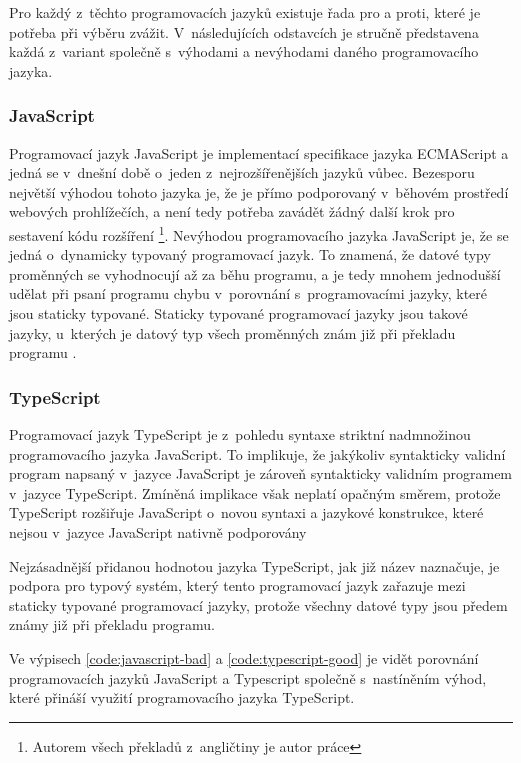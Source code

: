 Pro každý z~těchto programovacích jazyků existuje řada pro a proti, které je potřeba při výběru zvážit. V~následujících odstavcích je stručně představena každá z~variant společně s~výhodami a nevýhodami daného programovacího jazyka.

\subsubsection{JavaScript}

 Programovací jazyk JavaScript je implementací specifikace jazyka ECMAScript a jedná se v~dnešní době o~jeden z~nejrozšířenějších jazyků vůbec. Bezesporu největší výhodou tohoto jazyka je, že je přímo podporovaný v~běhovém prostředí webových prohlížečích, a není tedy potřeba zavádět žádný další krok pro sestavení kódu rozšíření \cite[kap. 1]{flanagan_javascript_2020}\footnote{Autorem všech překladů z~angličtiny je autor práce}. 
 Nevýhodou programovacího jazyka JavaScript je, že se jedná o~dynamicky typovaný programovací jazyk. To znamená, že datové typy proměnných se vyhodnocují až za běhu programu, a je tedy mnohem jednodušší udělat při psaní programu chybu v~porovnání s~programovacími jazyky, které jsou staticky typované. Staticky typované programovací jazyky jsou takové jazyky, u~kterých je datový typ všech proměnných znám již při překladu programu \cite[kap. 3.1]{flanagan_javascript_2020}.

\subsubsection{TypeScript}

Programovací jazyk TypeScript je z~pohledu syntaxe striktní nadmnožinou programovacího jazyka JavaScript. 
To implikuje, že jakýkoliv syntakticky validní program napsaný v~jazyce JavaScript je zároveň syntakticky validním programem v~jazyce TypeScript. Zmíněná implikace však neplatí opačným směrem, protože TypeScript rozšiřuje JavaScript o~novou syntaxi a jazykové konstrukce, které nejsou v~jazyce JavaScript nativně podporovány \cite{cherny_programming_2019}

Nejzásadnější přidanou hodnotou jazyka TypeScript, jak již název naznačuje, je podpora pro typový systém, který tento programovací jazyk zařazuje mezi staticky typované programovací jazyky, protože všechny datové typy jsou předem známy již při překladu programu. 

Ve výpisech \ref{code:javascript-bad} a \ref{code:typescript-good} je vidět porovnání programovacích jazyků JavaScript a Typescript společně s~nastíněním výhod, které přináší využití programovacího jazyka TypeScript.

